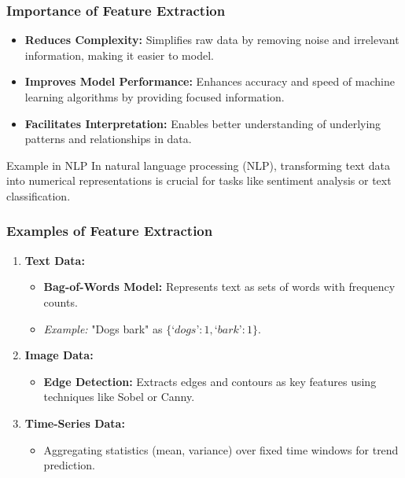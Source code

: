 \documentclass[aspectratio=169]{beamer}
\begin{document}
\begin{frame}[fragile]
    \frametitle{Importance of Feature Extraction}
    \begin{itemize}
        \item \textbf{Reduces Complexity:} Simplifies raw data by removing noise and irrelevant information, making it easier to model.
        \item \textbf{Improves Model Performance:} Enhances accuracy and speed of machine learning algorithms by providing focused information.
        \item \textbf{Facilitates Interpretation:} Enables better understanding of underlying patterns and relationships in data.
    \end{itemize}
    
    \begin{block}{Example in NLP}
        In natural language processing (NLP), transforming text data into numerical representations is crucial for tasks like sentiment analysis or text classification.
    \end{block}
\end{frame}

\begin{frame}[fragile]
    \frametitle{Examples of Feature Extraction}
    \begin{enumerate}
        \item \textbf{Text Data:}
        \begin{itemize}
            \item \textbf{Bag-of-Words Model:} Represents text as sets of words with frequency counts.
            \item \textit{Example:} "Dogs bark" as $\{‘dogs’: 1, ‘bark’: 1\}$.
        \end{itemize}
        
        \item \textbf{Image Data:}
        \begin{itemize}
            \item \textbf{Edge Detection:} Extracts edges and contours as key features using techniques like Sobel or Canny.
        \end{itemize}
        
        \item \textbf{Time-Series Data:}
        \begin{itemize}
            \item Aggregating statistics (mean, variance) over fixed time windows for trend prediction.
        \end{itemize}
    \end{enumerate}
\end{frame}
\end{document}
